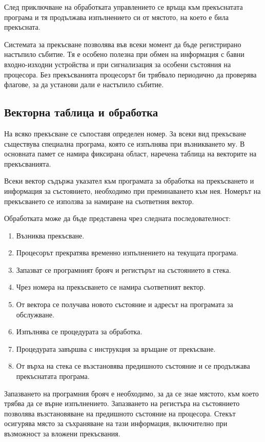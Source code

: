 След приключване на обработката управлението се връща към прекъснатата програма и тя продължава изпълнението си от мястото, на което е била прекъсната.

Системата за прекъсване позволява във всеки момент да бъде регистрирано настъпило събитие. Тя е особено полезна при обмен на информация с бавни входно-изходни устройства и при сигнализация за особени състояния на процесора. Без прекъсванията процесорът би трябвало периодично да проверява флагове, за да установи дали е настъпило събитие.

\subsection{Векторна таблица и обработка}\label{s:10.4.2}

На всяко прекъсване се съпоставя определен номер. За всеки вид прекъсване съществува специална програма, която се изпълнява при възникването му. В основната памет се намира фиксирана област, наречена таблица на векторите на прекъсванията.

Всеки вектор съдържа указател към програмата за обработка на прекъсването и информация за състоянието, необходимо при преминаването към нея. Номерът на прекъсването се използва за намиране на съответния вектор.

Обработката може да бъде представена чрез следната последователност:

\begin{enumerate}
    \item Възниква прекъсване.
    \item Процесорът прекратява временно изпълнението на текущата програма.
    \item Запазват се програмният брояч и регистърът на състоянието в стека.
    \item Чрез номера на прекъсването се намира съответният вектор.
    \item От вектора се получава новото състояние и адресът на програмата за обслужване.
    \item Изпълнява се процедурата за обработка.
    \item Процедурата завършва с инструкция за връщане от прекъсване.
    \item От върха на стека се възстановява предишното състояние и се продължава прекъснатата програма.
\end{enumerate}

Запазването на програмния брояч е необходимо, за да се знае мястото, към което трябва да се върне изпълнението. Запазването на регистъра на състоянието позволява възстановяване на предишното състояние на процесора. Стекът осигурява място за съхраняване на тази информация, включително при възможност за вложени прекъсвания.

